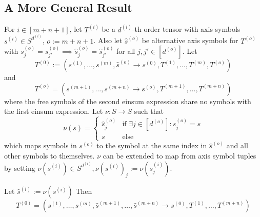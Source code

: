 \subsection{A More General Result}
\begin{theorem}
    For $i \in [m + n + 1]$, let $T^{(i)}$ be a $d^{(i)}$-th order tensor with axis symbols $s^{(i)} \in S^{d^{(i)}}$, $o := m + n + 1$.
    Also let $\hat{s}^{(o)}$ be alternative axis symbols for $T^{(o)}$ with $s^{(o)}_j = s^{(o)}_{j'} \implies \hat{s}^{(o)}_j = \hat{s}^{(o)}_{j'}$ for all $j, j' \in [d^{(o)}]$.
    Let
    $$T^{(0)} := (s^{(1)},\dots,s^{(m)}, \hat{s}^{(o)} \rightarrow s^{(0)}, T^{(1)},\dots,T^{(m)}, T^{(o)})$$
    and
    $$T^{(o)} = (s^{(m + 1)},\dots,s^{(m + n)} \rightarrow s^{(o)}, T^{(m + 1)},\dots,T^{(m + n)})$$
    where the free symbols of the second einsum expression share no symbols with the first einsum expression.
    Let $\nu: S \rightarrow S$ such that
    $$\nu(s) = \begin{cases}
            \hat{s}^{(o)}_j & \text{if }\exists j \in [d^{(o)}]: s^{(o)}_j = s \\
            s               & \text{else}
        \end{cases}$$
    which maps symbols in $s^{(o)}$ to the symbol at the same index in $\hat{s}^{(o)}$ and all other symbols to themselves.
    $\nu$ can be extended to map from axis symbol tuples by setting $\nu(s^{(i)}) \in S^{d^{(i)}}, \nu(s^{(i)})_j := \nu(s^{(i)}_j)$.

    Let $\hat{s}^{(i)} := \nu(s^{(i)})$
    Then
    $$T^{(0)} = (s^{(1)},\dots,s^{(m)}, \hat{s}^{(m + 1)}, \dots, \hat{s}^{(m + n)} \rightarrow s^{(0)}, T^{(1)},\dots,T^{(m + n)})$$
\end{theorem}
